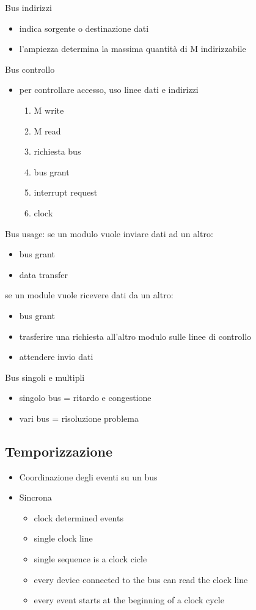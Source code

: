 \documentclass[12pt, a4paper]{article}
\theoremstyle{break}
\theoremstyle{lemma}
\theoremstyle{lemma}
\theoremstyle{lemma}
\begin{document}
Bus indirizzi
\begin{itemize}
	\item indica sorgente o destinazione dati
	\item l'ampiezza determina la massima quantità di M indirizzabile
\end{itemize}

Bus controllo
\begin{itemize}
	\item per controllare accesso, uso linee dati e indirizzi
	\begin{enumerate}
		\item M write
		\item M read
		\item richiesta bus
		\item bus grant
		\item interrupt request
		\item clock
	\end{enumerate}
\end{itemize}

Bus usage:
se un modulo vuole inviare dati ad un altro:
\begin{itemize}
	\item bus grant
	\item data transfer
\end{itemize}

se un module vuole ricevere dati da un altro:
\begin{itemize}
	\item bus grant
	\item trasferire una richiesta all'altro modulo sulle linee di controllo 
	\item attendere invio dati
\end{itemize}

Bus singoli e multipli
\begin{itemize}
	\item singolo bus = ritardo e congestione
	\item vari bus = risoluzione problema
\end{itemize}

\subsection{Temporizzazione}
\begin{itemize}
	\item Coordinazione degli eventi su un bus
	\item Sincrona
	\begin{itemize}
		\item clock determined events
		\item single clock line
		\item single sequence is a clock cicle
		\item every device connected to the bus can read the clock line
		\item every event starts at the beginning of a clock cycle
	\end{itemize}
\end{itemize}
\end{document}

